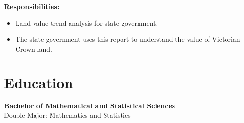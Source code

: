 \documentclass{article}
\begin{document}
\textbf{Responsibilities:}
\begin{itemize}
    \item Land value trend analysis for state government.
    \item The state government uses this report to understand the value of Victorian Crown land.
\end{itemize}

\section{Education}
\textbf{Bachelor of Mathematical and Statistical Sciences}
\\
Double Major: Mathematics and Statistics
\end{document}
